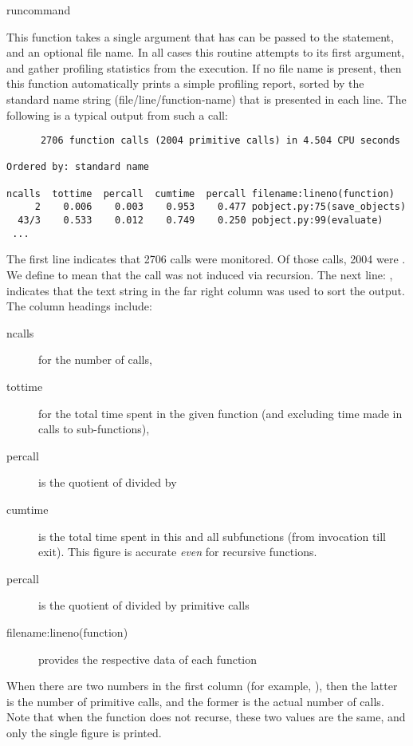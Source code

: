 \begin{funcdesc}{run}{command}

This function takes a single argument that has can be passed to the
 statement, and an optional file name.  In all cases this
routine attempts to  its first argument, and gather profiling
statistics from the execution. If no file name is present, then this
function automatically prints a simple profiling report, sorted by the
standard name string (file/line/function-name) that is presented in
each line.  The following is a typical output from such a call:

\begin{verbatim}
      2706 function calls (2004 primitive calls) in 4.504 CPU seconds

Ordered by: standard name

ncalls  tottime  percall  cumtime  percall filename:lineno(function)
     2    0.006    0.003    0.953    0.477 pobject.py:75(save_objects)
  43/3    0.533    0.012    0.749    0.250 pobject.py:99(evaluate)
 ...
\end{verbatim}

The first line indicates that 2706 calls were
monitored.  Of those calls, 2004 were .  We define
 to mean that the call was not induced via recursion.
The next line: , indicates that
the text string in the far right column was used to sort the output.
The column headings include:

\begin{description}

\item[ncalls ]
for the number of calls,

\item[tottime ]
for the total time spent in the given function (and excluding time
made in calls to sub-functions),

\item[percall ]
is the quotient of  divided by 

\item[cumtime ]
is the total time spent in this and all subfunctions (from invocation
till exit). This figure is accurate \emph{even} for recursive
functions.

\item[percall ]
is the quotient of  divided by primitive calls

\item[filename:lineno(function) ]
provides the respective data of each function

\end{description}

When there are two numbers in the first column (for example,
), then the latter is the number of primitive calls, and
the former is the actual number of calls.  Note that when the function
does not recurse, these two values are the same, and only the single
figure is printed.

\end{funcdesc}

